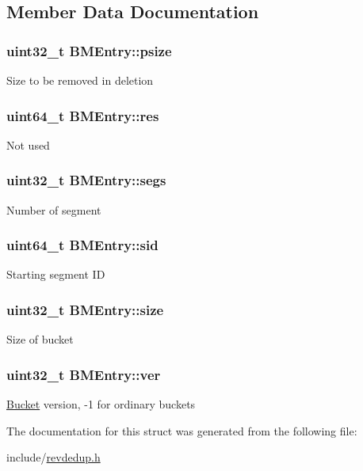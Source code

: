 \subsection{\-Member \-Data \-Documentation}
\hypertarget{structBMEntry_ae3868e1dcdcb708366dc4a23b2f707ef}{
\subsubsection[{psize}]{\setlength{\rightskip}{0pt plus 5cm}uint32\-\_\-t {\bf \-B\-M\-Entry\-::psize}}}\label{structBMEntry_ae3868e1dcdcb708366dc4a23b2f707ef}
\-Size to be removed in deletion \hypertarget{structBMEntry_a01ebfb22eb304f391f4f2b511bf088c5}{
\subsubsection[{res}]{\setlength{\rightskip}{0pt plus 5cm}uint64\-\_\-t {\bf \-B\-M\-Entry\-::res}}}\label{structBMEntry_a01ebfb22eb304f391f4f2b511bf088c5}
\-Not used \hypertarget{structBMEntry_a223ee21a6a789e0ff7fbab0625f7958f}{
\subsubsection[{segs}]{\setlength{\rightskip}{0pt plus 5cm}uint32\-\_\-t {\bf \-B\-M\-Entry\-::segs}}}\label{structBMEntry_a223ee21a6a789e0ff7fbab0625f7958f}
\-Number of segment \hypertarget{structBMEntry_a86084e47eeb55740eb5782b4e2c01010}{
\subsubsection[{sid}]{\setlength{\rightskip}{0pt plus 5cm}uint64\-\_\-t {\bf \-B\-M\-Entry\-::sid}}}\label{structBMEntry_a86084e47eeb55740eb5782b4e2c01010}
\-Starting segment \-I\-D \hypertarget{structBMEntry_adf6e7d636ace7973d4219f9cb2230cb5}{
\subsubsection[{size}]{\setlength{\rightskip}{0pt plus 5cm}uint32\-\_\-t {\bf \-B\-M\-Entry\-::size}}}\label{structBMEntry_adf6e7d636ace7973d4219f9cb2230cb5}
\-Size of bucket \hypertarget{structBMEntry_aa83f08bc3da9de006644e89a3eeb28e8}{
\subsubsection[{ver}]{\setlength{\rightskip}{0pt plus 5cm}uint32\-\_\-t {\bf \-B\-M\-Entry\-::ver}}}\label{structBMEntry_aa83f08bc3da9de006644e89a3eeb28e8}
\hyperlink{structBucket}{\-Bucket} version, -\/1 for ordinary buckets 

\-The documentation for this struct was generated from the following file\-:\begin{DoxyCompactItemize}
\item 
include/\hyperlink{revdedup_8h}{revdedup.\-h}\end{DoxyCompactItemize}
